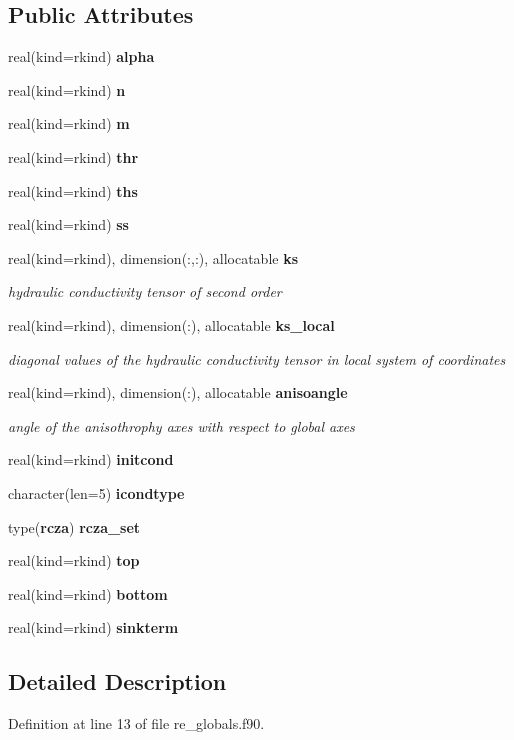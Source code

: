 \subsection*{Public Attributes}
\begin{DoxyCompactItemize}
\item 
real(kind=rkind) {\bf alpha}
\item 
real(kind=rkind) {\bf n}
\item 
real(kind=rkind) {\bf m}
\item 
real(kind=rkind) {\bf thr}
\item 
real(kind=rkind) {\bf ths}
\item 
real(kind=rkind) {\bf ss}
\item 
real(kind=rkind), dimension(\+:,\+:), allocatable {\bf ks}
\begin{DoxyCompactList}\small\item\em hydraulic conductivity tensor of second order \end{DoxyCompactList}\item 
real(kind=rkind), dimension(\+:), allocatable {\bf ks\+\_\+local}
\begin{DoxyCompactList}\small\item\em diagonal values of the hydraulic conductivity tensor in local system of coordinates \end{DoxyCompactList}\item 
real(kind=rkind), dimension(\+:), allocatable {\bf anisoangle}
\begin{DoxyCompactList}\small\item\em angle of the anisothrophy axes with respect to global axes \end{DoxyCompactList}\item 
real(kind=rkind) {\bf initcond}
\item 
character(len=5) {\bf icondtype}
\item 
type({\bf rcza}) {\bf rcza\+\_\+set}
\item 
real(kind=rkind) {\bf top}
\item 
real(kind=rkind) {\bf bottom}
\item 
real(kind=rkind) {\bf sinkterm}
\end{DoxyCompactItemize}


\subsection{Detailed Description}


Definition at line 13 of file re\+\_\+globals.\+f90.



